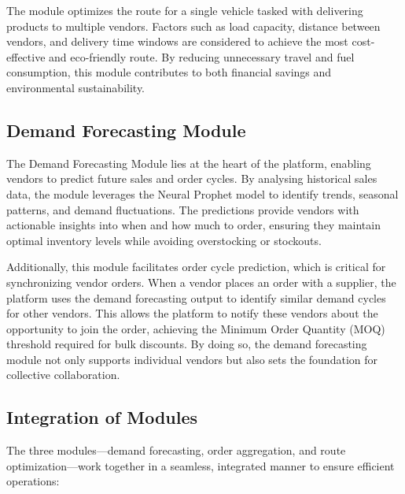 The module optimizes the route for a single vehicle tasked with delivering products to multiple vendors. Factors such as load capacity, distance between vendors, and delivery time windows are considered to achieve the most cost-effective and eco-friendly route. By reducing unnecessary travel and fuel consumption, this module contributes to both financial savings and environmental sustainability.

\subsection{Demand Forecasting Module}

The Demand Forecasting Module lies at the heart of the platform, enabling vendors to predict future sales and order cycles. By analysing historical sales data, the module leverages the Neural Prophet model to identify trends, seasonal patterns, and demand fluctuations. The predictions provide vendors with actionable insights into when and how much to order, ensuring they maintain optimal inventory levels while avoiding overstocking or stockouts.

Additionally, this module facilitates order cycle prediction, which is critical for synchronizing vendor orders. When a vendor places an order with a supplier, the platform uses the demand forecasting output to identify similar demand cycles for other vendors. This allows the platform to notify these vendors about the opportunity to join the order, achieving the Minimum Order Quantity (MOQ) threshold required for bulk discounts. By doing so, the demand forecasting module not only supports individual vendors but also sets the foundation for collective collaboration.


\subsection{Integration of Modules}

The three modules—demand forecasting, order aggregation, and route optimization—work together in a seamless, integrated manner to ensure efficient operations:

